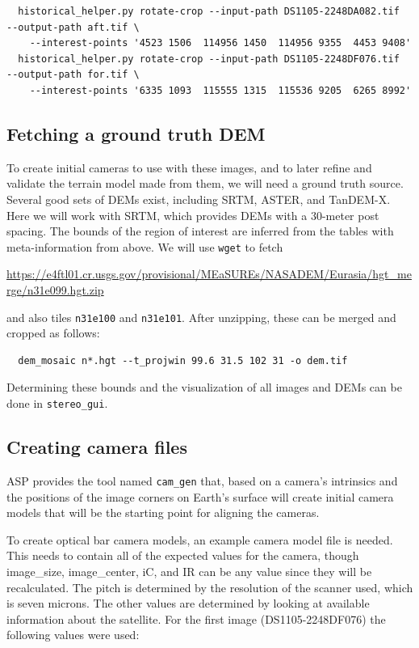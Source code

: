 \begin{verbatim}
  historical_helper.py rotate-crop --input-path DS1105-2248DA082.tif  --output-path aft.tif \
    --interest-points '4523 1506  114956 1450  114956 9355  4453 9408'
  historical_helper.py rotate-crop --input-path DS1105-2248DF076.tif  --output-path for.tif \
    --interest-points '6335 1093  115555 1315  115536 9205  6265 8992'
\end{verbatim}

\subsection{Fetching a ground truth DEM}

To create initial cameras to use with these images, and to later refine and validate
the terrain model made from them, we will need a ground truth source. 
Several good sets of DEMs exist, including SRTM, ASTER, and TanDEM-X. Here we will
work with SRTM, which provides DEMs with a 30-meter post spacing. The bounds of the region 
of interest are inferred from the tables with meta-information from above. 
We will use \texttt{wget} to fetch
\begin{center}
\url{https://e4ftl01.cr.usgs.gov/provisional/MEaSUREs/NASADEM/Eurasia/hgt_merge/n31e099.hgt.zip}
\end{center}
and also tiles \texttt{n31e100} and \texttt{n31e101}. After unzipping, these can be
merged and cropped as follows:

\begin{verbatim}
  dem_mosaic n*.hgt --t_projwin 99.6 31.5 102 31 -o dem.tif
\end{verbatim}

Determining these bounds and the visualization of all images and DEMs
can be done in \texttt{stereo\_gui}.

\subsection{Creating camera files}

ASP provides the tool named \texttt{cam\_gen} that, based on a camera's intrinsics
and the positions of the image corners on Earth's surface will
create initial camera models that will be the starting point for aligning the cameras.

To create optical bar camera models, an example camera model file is needed.
This needs to contain all of the expected values for the camera, though
image\_size, image\_center, iC, and IR can be any value since they will be recalculated.
The pitch is determined by the resolution of the scanner used, which is seven microns.
The other values are determined by looking at available information about the satellite.
For the first image (DS1105-2248DF076) the following values were used:

